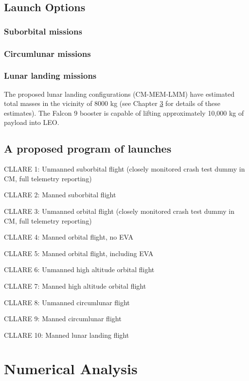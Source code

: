 \documentclass{report}
\begin{document}
\section{Launch Options}

\subsection{Suborbital missions}

\subsection{Circumlunar missions}

\subsection{Lunar landing missions}

The proposed lunar landing configurations (CM-MEM-LMM) have estimated total masses in the vicinity of 8000 kg (see Chapter \ref{chap:numeric} for details of these estimates).  The Falcon 9 booster is capable of lifting approximately 10,000 kg of payload into LEO.

\section{A proposed program of launches}

CLLARE 1: Unmanned suborbital flight (closely monitored crash test dummy in CM, full telemetry reporting)

CLLARE 2: Manned suborbital flight

CLLARE 3: Unmanned orbital flight (closely monitored crash test dummy in CM, full telemetry reporting)

CLLARE 4: Manned orbital flight, no EVA

CLLARE 5: Manned orbital flight, including EVA

CLLARE 6: Unmanned high altitude orbital flight

CLLARE 7: Manned high altitude orbital flight

CLLARE 8: Unmanned circumlunar flight

CLLARE 9: Manned circumlunar flight

CLLARE 10: Manned lunar landing flight


\chapter{Numerical Analysis} \label{chap:numeric}
\end{document}
